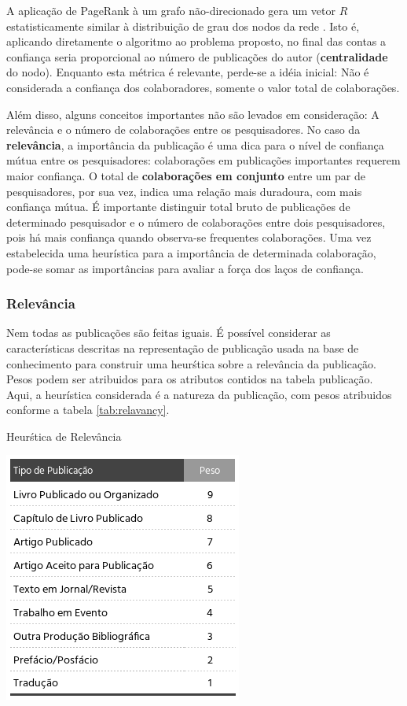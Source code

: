 \documentclass[12pt]{article}
\begin{document}
A aplicação de PageRank à um grafo não-direcionado gera um vetor $R$ estatisticamente similar à distribuição de grau dos nodos da 
rede \cite{perra2008spectral}. Isto é, aplicando diretamente o algoritmo ao problema proposto, no final das contas a confiança 
seria proporcional ao número de publicações do autor (\textbf{centralidade} do nodo). Enquanto esta métrica é relevante, perde-se 
a idéia inicial: Não é considerada a confiança dos colaboradores, somente o valor total de colaborações. 

Além disso, alguns conceitos importantes não são levados em consideração: A relevância e o número de colaborações entre os 
pesquisadores. No caso da \textbf{relevância}, a importância da publicação é uma dica para o nível de confiança mútua entre os 
pesquisadores: colaborações em publicações importantes requerem maior confiança. O total de \textbf{colaborações em conjunto} 
entre um par de pesquisadores, por sua vez, indica uma relação mais duradoura, com mais confiança mútua. É importante distinguir 
total bruto de publicações de determinado pesquisador e o número de colaborações entre dois pesquisadores, pois há mais confiança 
quando observa-se frequentes colaborações.  Uma vez estabelecida uma heurística para a importância de determinada colaboração, 
pode-se somar as importâncias para avaliar a força dos laços de confiança.

\subsubsection{Relevância}

Nem todas as publicações são feitas iguais. É possível considerar as características descritas na representação de publicação 
usada na base de conhecimento para construir uma heurśtica sobre a relevância da publicação. Pesos podem ser atribuidos para os 
atributos contidos na tabela publicação. Aqui, a heurística considerada é a natureza da publicação, com pesos atribuidos conforme 
a tabela \ref{tab:relavancy}.

\begin{center}
  \begin{table}[ht]
    \centering
    \caption{Heurśtica de Relevância}
    \label{tab:relavancy}
    \includegraphics[width=.4\textwidth]{heuristics.png}
    \end{table}
\end{center}
\end{document}
